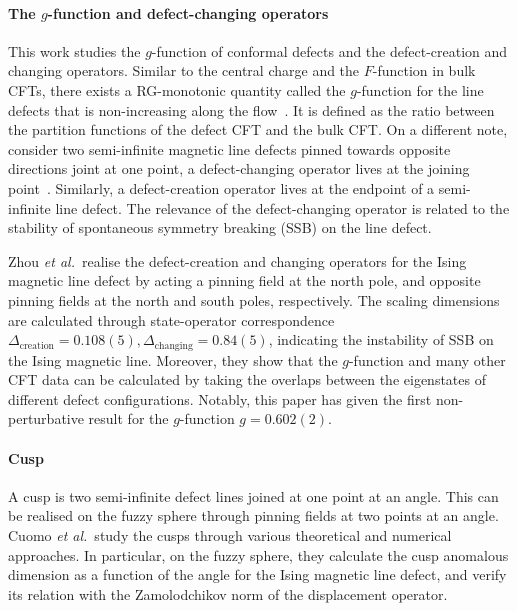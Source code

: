 \documentclass{timesjhep}
\begin{document}
\paragraph{The $g$-function and defect-changing operators~\cite{Zhou2024Jan}}

This work studies the $g$-function of conformal defects and the defect-creation and changing operators. Similar to the central charge and the $F$-function in bulk CFTs, there exists a RG-monotonic quantity called the $g$-function for the line defects that is non-increasing along the flow~\cite{Cuomo2021gfn,Casini2022gfn}. It is defined as the ratio between the partition functions of the defect CFT and the bulk CFT. On a different note, consider two semi-infinite magnetic line defects pinned towards opposite directions joint at one point, a defect-changing operator lives at the joining point~\cite{Affleck1994DefCh,Affleck1996DefCh}. Similarly, a defect-creation operator lives at the endpoint of a semi-infinite line defect. The relevance of the defect-changing operator is related to the stability of spontaneous symmetry breaking (SSB) on the line defect.

Zhou \textit{et al.}~realise the defect-creation and changing operators for the Ising magnetic line defect by acting a pinning field at the north pole, and opposite pinning fields at the north and south poles, respectively. The scaling dimensions are calculated through state-operator correspondence $\Delta_{\textrm{creation}}=0.108(5),\Delta_{\textrm{changing}}=0.84(5)$, indicating the instability of SSB on the Ising magnetic line. Moreover, they show that the $g$-function and many other CFT data can be calculated by taking the overlaps between the eigenstates of different defect configurations. Notably, this paper has given the first non-perturbative result for the $g$-function $g=0.602(2)$.

\paragraph{Cusp~\cite{Cuomo2024}}

A cusp is two semi-infinite defect lines joined at one point at an angle. This can be realised on the fuzzy sphere through pinning fields at two points at an angle. Cuomo \textit{et al.}~study the cusps through various theoretical and numerical approaches. In particular, on the fuzzy sphere, they calculate the cusp anomalous dimension as a function of the angle for the Ising magnetic line defect, and verify its relation with the Zamolodchikov norm of the displacement operator.
\end{document}
